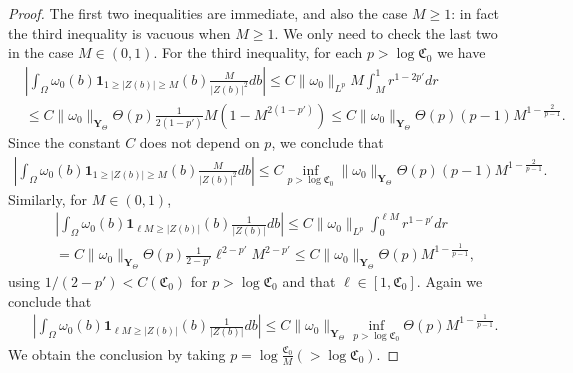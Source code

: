\documentclass[12pt]{article}
\begin{document}
\begin{proof}
The first two inequalities are immediate, and also the case $M\ge 1$: in fact the third inequality is vacuous when $M \ge 1$. We only need to check the last two in the case $M\in (0,1)$. For the third inequality, for each $p > \log \mathfrak{C}_0 $ we have
\begin{equation}
\begin{split}
&\left | \int_{\Omega} \omega_0 (b) \mathbf{1}_{1 \ge |Z(b) | \ge M } (b) \frac{M}{|Z(b)|^2}   db \right | \le C \| \omega_0 \|_{L^p}   M \int_M ^1 r^{1 - 2p'} dr \\
&\le C  \| \omega_0 \|_{\mathbf{Y}_{\Theta} }  \Theta(p) \frac{1}{2(1-p')} M (1-M^{2(1-p')} ) \le C \| \omega_0 \|_{\mathbf{Y}_{\Theta} } \Theta(p) (p-1) M^{1-\frac{2}{p-1} }.
\end{split}
\end{equation}
Since the constant $C$ does not depend on $p$, we conclude that 
\begin{equation}
\begin{split}
\left | \int_{\Omega} \omega_0 (b) \mathbf{1}_{1 \ge |Z(b) | \ge M } (b) \frac{M}{|Z(b)|^2}   db \right | \le  C \inf_{p > \log \mathfrak{C}_0 }  \| \omega_0 \|_{\mathbf{Y}_{\Theta} } \Theta(p) (p-1) M^{1-\frac{2}{p-1} }.
\end{split}
\end{equation}
Similarly, for $M \in (0,1)$, 
\begin{equation}
\begin{split}
&\left | \int_{\Omega} \omega_0 (b) \mathbf{1}_{\ell M \ge |Z(b) | } (b) \frac{1}{|Z(b) | }   db \right | \le C \| \omega_0 \|_{L^p} \int_0 ^{\ell M} r^{1-p'} dr \\
& = C \| \omega_0 \|_{\mathbf{Y}_{\Theta} } \Theta(p) \frac{1}{2-p'}  \ell^{2-p'} M^{2-p'} \le C \| \omega_0 \|_{\mathbf{Y}_{\Theta} } \Theta(p) M^{1- \frac{1}{p-1} },
\end{split}
\end{equation}
using $1/(2-p') < C(\mathfrak{C}_0 ) $ for $p>\log \mathfrak{C}_0 $ and that $\ell \in [1, \mathfrak{C}_0 ]$. Again we conclude that
\begin{equation}
\begin{split}
&\left | \int_{\Omega} \omega_0 (b) \mathbf{1}_{\ell M \ge |Z(b) | } (b) \frac{1}{|Z(b) | }   db \right | \le
C \| \omega_0 \|_{\mathbf{Y}_{\Theta} } \inf_{p > \log \mathfrak{C}_0 } \Theta(p) M^{1-\frac{1}{p-1} }.
\end{split}
\end{equation}
We obtain the conclusion by taking $p = \log \frac{\mathfrak{C}_0}{ M } (>\log \mathfrak{C}_0 )$.
\end{proof}
\end{document}

